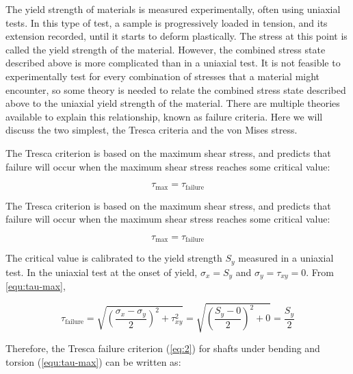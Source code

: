 The yield strength of materials is measured experimentally, often using uniaxial tests. In this type of test, a sample is progressively loaded in tension, and its extension recorded, until it starts to deform plastically. The stress at this point is called the yield strength of the material. However, the combined stress state described above is more complicated than in a uniaxial test. It is not feasible to experimentally test for every combination of stresses that a material might encounter, so some theory is needed to relate the combined stress state described above to the uniaxial yield strength of the material. There are multiple theories available to explain this relationship, known as failure criteria. Here we will discuss the two simplest, the Tresca criteria and the von Mises stress.

The Tresca criterion is based on the maximum shear stress, and predicts that failure will occur when the maximum shear stress reaches some critical value:

\begin{equation}
  \tau_{\max} = \tau_{\text{failure}}
\end{equation}

The Tresca criterion is based on the maximum shear
stress, and predicts that failure will occur when the maximum shear stress
reaches some critical value:

\begin{equation}
\label{eq:2}
\tau_\mathrm{max} = \tau_\mathrm{failure}
\end{equation}

The critical value is calibrated to the yield strength $S_y$ measured in a
uniaxial test. In the uniaxial test at the onset of yield, $\sigma_x = S_y$ and
$\sigma_y = \tau_{xy} = 0$. From \cref{equ:tau-max},

\begin{equation}
\label{eq:4}
\tau_\mathrm{failure} = \sqrt{\left(\frac{\sigma_x-\sigma_y}{2}\right)^2+\tau_{xy}^2} = \sqrt{\left(\frac{S_y-0}{2}\right)^2+0} = \frac{S_y}{2}
\end{equation}

Therefore, the Tresca failure criterion (\cref{eq:2}) for shafts under bending
and torsion (\cref{equ:tau-max}) can be written as:

